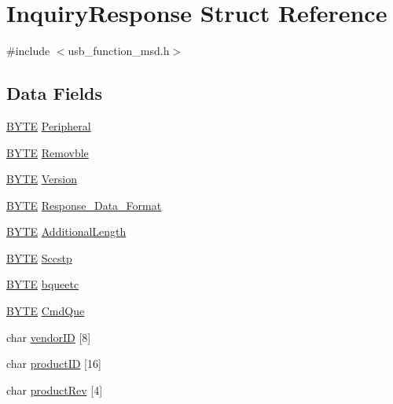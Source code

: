 \hypertarget{struct_inquiry_response}{}\section{Inquiry\+Response Struct Reference}
\label{struct_inquiry_response}


{\ttfamily \#include $<$usb\+\_\+function\+\_\+msd.\+h$>$}

\subsection*{Data Fields}
\begin{DoxyCompactItemize}
\item 
\hyperlink{_generic_type_defs_8h_a4ae1dab0fb4b072a66584546209e7d58}{B\+Y\+T\+E} \hyperlink{struct_inquiry_response_aeddc5b07132cbdd62d9d14e6efb88120}{Peripheral}
\item 
\hyperlink{_generic_type_defs_8h_a4ae1dab0fb4b072a66584546209e7d58}{B\+Y\+T\+E} \hyperlink{struct_inquiry_response_ad590a95ec7dccf9150a3e96582330f07}{Removble}
\item 
\hyperlink{_generic_type_defs_8h_a4ae1dab0fb4b072a66584546209e7d58}{B\+Y\+T\+E} \hyperlink{struct_inquiry_response_a577c23a9e78dc407891d2b2bbc13c227}{Version}
\item 
\hyperlink{_generic_type_defs_8h_a4ae1dab0fb4b072a66584546209e7d58}{B\+Y\+T\+E} \hyperlink{struct_inquiry_response_a7b3511a819c3aa219bdcaaa78143be35}{Response\+\_\+\+Data\+\_\+\+Format}
\item 
\hyperlink{_generic_type_defs_8h_a4ae1dab0fb4b072a66584546209e7d58}{B\+Y\+T\+E} \hyperlink{struct_inquiry_response_a222eee42a3424cfb77f3830b55595cb6}{Additional\+Length}
\item 
\hyperlink{_generic_type_defs_8h_a4ae1dab0fb4b072a66584546209e7d58}{B\+Y\+T\+E} \hyperlink{struct_inquiry_response_a4be7f553d9e29ea87bee7c86707b129a}{Sccstp}
\item 
\hyperlink{_generic_type_defs_8h_a4ae1dab0fb4b072a66584546209e7d58}{B\+Y\+T\+E} \hyperlink{struct_inquiry_response_aa1796c00e058115e16fe277f60f7fd1b}{bqueetc}
\item 
\hyperlink{_generic_type_defs_8h_a4ae1dab0fb4b072a66584546209e7d58}{B\+Y\+T\+E} \hyperlink{struct_inquiry_response_afcb512a84035dc56c56bbc42041fed98}{Cmd\+Que}
\item 
char \hyperlink{struct_inquiry_response_a6e7ff767984c6c3c6f11c0847741cc34}{vendor\+I\+D} \mbox{[}8\mbox{]}
\item 
char \hyperlink{struct_inquiry_response_a09d7bedbda7e92cd94033f3e5225b71c}{product\+I\+D} \mbox{[}16\mbox{]}
\item 
char \hyperlink{struct_inquiry_response_a65a5a6fbf03ef47f18f56b5f834384a4}{product\+Rev} \mbox{[}4\mbox{]}
\end{DoxyCompactItemize}



